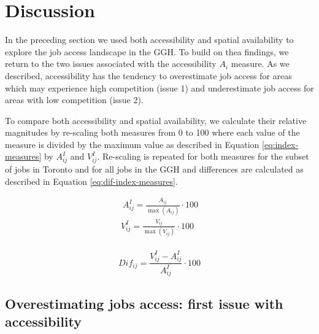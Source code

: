 \documentclass[]{elsarticle} %
\begin{document}
\newpage

\hypertarget{discussion}{%
\section{Discussion}\label{discussion}}

In the preceding section we used both accessibility and spatial
availability to explore the job access landscape in the GGH. To build on
thea findings, we return to the two issues associated with the
accessibility \(A_i\) measure. As we described, accessibility has the
tendency to overestimate job access for areas which may experience high
competition (issue 1) and underestimate job access for areas with low
competition (issue 2).

To compare both accessibility and spatial availability, we calculate
their relative magnitudes by re-scaling both measures from 0 to 100
where each value of the measure is divided by the maximum value as
described in Equation \ref{eq:index-measures} by \(A^I_{ij}\) and
\(V^I_{ij}\). Re-scaling is repeated for both measures for the subset of
jobs in Toronto and for all jobs in the GGH and differences are
calculated as described in Equation \ref{eq:dif-index-measures}.

\begin{equation}
\label{eq:index-measures}
\begin{array}{l}\
A^I_{ij} = \frac{A_{ij}}{\max(A_{ij})}\cdot100\\
V^I_{ij} = \frac{V_{ij}}{\max(V_{ij})}\cdot100\\
\end{array}
\end{equation}

\begin{equation}
\label{eq:dif-index-measures}
Dif_{ij} = \frac{V^I_{ij} - A^I_{ij}}{A^I_{ij}}\cdot100
\end{equation}

\hypertarget{overestimating-jobs-access-first-issue-with-accessibility}{%
\subsection{Overestimating jobs access: first issue with
accessibility}\label{overestimating-jobs-access-first-issue-with-accessibility}}
\end{document}
